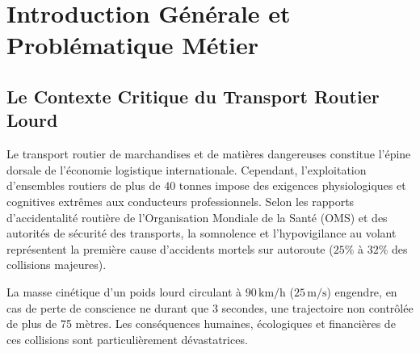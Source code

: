 \documentclass[11pt,a4paper]{article}
\begin{document}
\newpage
\tableofcontents
\newpage

\section{Introduction Générale et Problématique Métier}

\subsection{Le Contexte Critique du Transport Routier Lourd}
Le transport routier de marchandises et de matières dangereuses constitue l'épine dorsale de l'économie logistique internationale. Cependant, l'exploitation d'ensembles routiers de plus de $40\text{ tonnes}$ impose des exigences physiologiques et cognitives extrêmes aux conducteurs professionnels. Selon les rapports d'accidentalité routière de l'Organisation Mondiale de la Santé (OMS) et des autorités de sécurité des transports, la somnolence et l'hypovigilance au volant représentent la première cause d'accidents mortels sur autoroute ($25\%$ à $32\%$ des collisions majeures).

La masse cinétique d'un poids lourd circulant à $90\,\text{km/h}$ ($25\,\text{m/s}$) engendre, en cas de perte de conscience ne durant que 3 secondes, une trajectoire non contrôlée de plus de 75 mètres. Les conséquences humaines, écologiques et financières de ces collisions sont particulièrement dévastatrices.
\end{document}

